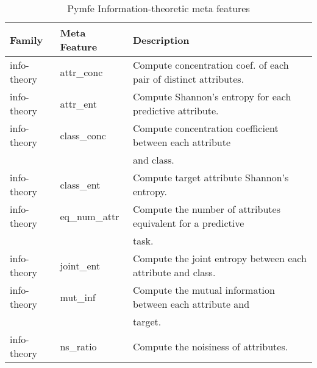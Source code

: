 \begin{table}[h!]
  \centering
  \caption{Pymfe Information-theoretic meta features}
  \setlength{\tabcolsep}{8pt}
    \renewcommand{\arraystretch}{1.2}
      \begin{tabular}{lll}
        \hline
      Family & Meta Feature & Description \\
      \hline
      info-theory & attr\_conc & Compute concentration coef. of each pair of distinct attributes.\\
      info-theory & attr\_ent & Compute Shannon’s entropy for each predictive attribute.\\
      info-theory & class\_conc & Compute concentration coefficient between each attribute\\ & & and class.\\
      info-theory & class\_ent & Compute target attribute Shannon’s entropy.\\
      info-theory & eq\_num\_attr & Compute the number of attributes equivalent for a predictive\\ & & task.\\
      info-theory & joint\_ent & Compute the joint entropy between each attribute and class.\\
      info-theory & mut\_inf & Compute the mutual information between each attribute and\\ & & target.\\
      info-theory & ns\_ratio & Compute the noisiness of attributes.\\\hline
  \end{tabular}
  \label{tab:pymfe-it-mf}
\end{table}

